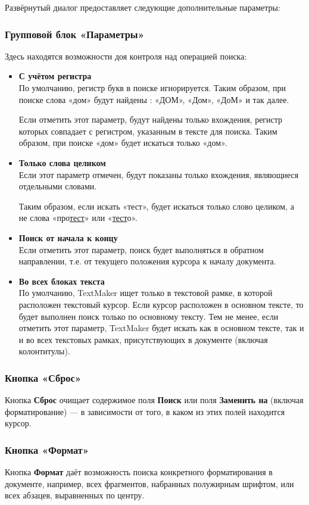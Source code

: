 ﻿\documentclass[a4paper,10pt]{article}
\begin{document}
Развёрнутый диалог предоставляет следующие дополнительные параметры:

\subsubsection{Групповой блок «Параметры»}
Здесь находятся возможности доя контроля над операцией поиска:
\begin{itemize}
 \item \textbf{С учётом регистра}\\
 По умолчанию, регистр букв в поиске игнорируется. Таким образом, при поиске слова «дом» будут найдены : «ДОМ», «Дом», «ДоМ» и так далее.
 
Если отметить этот параметр, будут найдены только вхождения, регистр которых совпадает с регистром, указанным в тексте для поиска. Таким образом, при поиске «дом» будет искаться только «дом».
\item \textbf{Только слова целиком}\\
Если этот параметр отмечен, будут показаны только вхождения, являющиеся отдельными словами.

Таким образом, если искать «тест», будет искаться только слово целиком, а не слова «про\underline{тест}» или «\underline{тест}о».
\item \textbf{Поиск от начала к концу}\\
Если отметить этот параметр, поиск будет выполняться в  обратном направлении, т.е. от текущего положения курсора к началу документа.
\item \textbf{Во всех блоках текста}\\
По умолчанию, TextMaker ищет только в текстовой рамке, в которой расположен текстовый курсор. Если курсор расположен в основном тексте, то будет выполнен поиск только по основному тексту. Тем не менее, если отметить этот параметр, TextMaker будет искать как в основном тексте, так и и во всех текстовых рамках, присутствующих в документе (включая колонтитулы).
\end{itemize}

\subsubsection{Кнопка «Сброс»}
Кнопка \textbf{Сброс} очищает содержимое поля \textbf{Поиск} или поля \textbf{Заменить на} (включая форматирование) — в зависимости от того, в каком из этих полей находится курсор.

\subsubsection{Кнопка «Формат»}
Кнопка \textbf{Формат} даёт возможность поиска конкретного форматирования в документе, например, всех фрагментов, набранных полужирным шрифтом, или всех абзацев, выравненных по центру.
\end{document}

